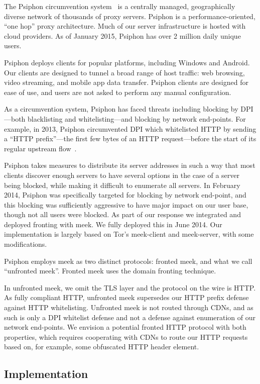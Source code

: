 \documentclass{sig-alternate}
\begin{document}
The Psiphon circumvention system~\cite{psiphon} is a centrally managed, geographically
diverse network of thousands of proxy servers. Psiphon is a
performance-oriented, ``one hop'' proxy architecture. Much of our server
infrastructure is hosted with cloud providers. As of January 2015, Psiphon
has over 2 million daily unique users.

Psiphon deploys clients for popular platforms, including Windows and
Android. Our clients are designed to tunnel a broad range of host traffic:
web browsing, video streaming, and mobile app data transfer. Psiphon
clients are designed for ease of use, and users are not asked to perform
any manual configuration.

As a circumvention system, Psiphon has faced threats including blocking by
DPI---both blacklisting and whitelisting---and blocking by network
end-points. For example, in 2013, Psiphon circumvented DPI which
whitelisted HTTP by sending a ``HTTP prefix''---the first few bytes of an
HTTP request---before the start of its regular upstream flow~\cite{information-controls}.

Psiphon takes measures to distribute its server addresses in such a way
that most clients discover enough servers to have several options in the
case of a server being blocked, while making it difficult to enumerate all
servers. In February 2014, Psiphon was specifically targeted for blocking
by network end-point, and this blocking was sufficiently aggressive to have
major impact on our user base, though not all users were blocked. As part
of our response we integrated and deployed fronting with meek. We fully
deployed this in June 2014. Our implementation is largely based on Tor's
meek-client and meek-server, with some modifications.

Psiphon employs meek as two distinct protocols: fronted meek, and what we
call ``unfronted meek''. Fronted meek uses the domain fronting technique.

In unfronted meek, we omit the TLS layer and the protocol on the wire is
HTTP. As fully compliant HTTP, unfronted meek supersedes our HTTP prefix
defense against HTTP whitelisting. Unfronted meek is not routed through
CDNs, and as such is only a DPI whitelist defense and not a defense against
enumeration of our network end-points. We envision a potential fronted HTTP
protocol with both properties, which requires cooperating with CDNs to
route our HTTP requests based on, for example, some obfuscated HTTP header
element.

\subsection{Implementation}
\end{document}
